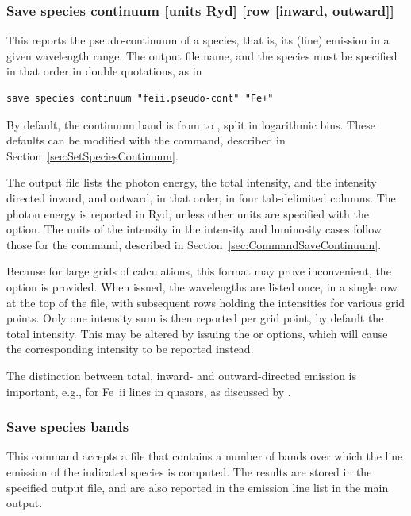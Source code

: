\subsubsection{Save species continuum [units Ryd] [row [inward, outward]]}
\label{sec:SaveSpeciesContinuum}
This reports the pseudo-continuum of a species, that is, its (line)
emission in a given wavelength range.
The output file name, and the species must be specified in that
order in double quotations, as in
%
\begin{verbatim}
save species continuum "feii.pseudo-cont" "Fe+"
\end{verbatim}
%
By default, the continuum band is from \speciesConWlLo{} to \speciesConWlHi{}, 
split in \speciesConNbins{} logarithmic bins.
These defaults can be modified with the 
command, described in Section~\ref{sec:SetSpeciesContinuum}.

\par
The output file lists the photon energy, the total intensity,
and the intensity directed inward, and outward, in that order,
in four tab-delimited columns.
The photon energy is reported in Ryd, unless other units are
specified with the  option.
The units of the intensity in the intensity and luminosity
cases follow those for the  command,
described in Section~\ref{sec:CommandSaveContinuum}.

Because for large grids of calculations, this format may prove
inconvenient, the  option is provided.
When issued, the wavelengths are listed once, in a single row
at the top of the file, with subsequent rows holding the intensities
for various grid points.
Only one intensity sum is then reported per grid point,
by default the total intensity.
This may be altered by issuing the  or
 options, which will cause the corresponding
intensity to be reported instead.

The distinction between total, inward- and outward-directed emission
is important, e.g., for Fe~{\sc ii} lines in quasars, as discussed
by \citet{FerlandHuEtAl2009}.


\subsubsection{Save species bands}
\label{sec:SaveSpeciesBands}

\par
This command accepts a file that contains a number of bands over which the
line emission of the indicated species is computed. The results are stored
in the specified output file, and are also reported in the emission line
list in the main output.

